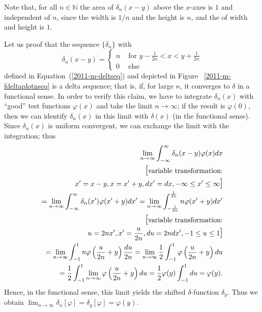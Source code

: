 Note that, for all $n\in \mathbb{N}$ the area of $\delta_n(x-y)$ above the $x$-axes
is $1$ and independent of $n$, since the width is $1/n$ and the height is $n$, and the of width and height is $1$.



{
\color{blue}
\bexample
Let us proof that the sequence $\{ \delta_n\}$ with
$$\delta_n(x-y) =
\left\{
\begin{array}{rl}
n & \textrm{ for } y - \frac{1}{2n}  < x < y+ \frac{1}{2n} \\
0& \textrm{ else }
\end{array}
\right.$$
defined in Equation~(\ref{2011-m-deltseq}) and depicted
in Figure~
\ref{2011-m-fdeltaplotnseq}
is a delta sequence;
that is, if, for large $n$, it converges to $\delta$ in a functional sense.
In order to verify this claim, we have to integrate $\delta_n(x)$
with ``good'' test functions $ \varphi (x)$ and take the limit $n\rightarrow \infty$;
if the result is $ \varphi (0)$, then we can identify $\delta_n(x)$ in this limit with $\delta (x)$
(in the functional sense).
Since $\delta_n(x)$ is uniform convergent, we can exchange the limit with the integration; thus
\begin{equation}
\begin{split}
\lim_{n\rightarrow \infty} \int_{-\infty}^\infty \delta_n(x-y) \varphi (x) dx \\
 \textrm{{\Large[}variable transformation:}  \\
  x'=x-y, x= x'+y, dx' =  dx, -\infty\le x' \le \infty \textrm{\Large]} \\
 =
\lim_{n\rightarrow \infty} \int_{-\infty}^\infty \delta_n(x') \varphi (x'+y) dx'
 =
\lim_{n\rightarrow \infty} \int_{- \frac{1}{2n}}^\frac{1}{2n} n \varphi (x'+y) dx'    \\
 \textrm{{\Large[}variable transformation:}  \\
  u=2nx', x'=\frac{u}{2n},
   du = 2n dx', -1\le u \le 1\textrm{\Large]} \\
 = \lim_{n\rightarrow \infty} \int_{- 1}^1 n \varphi \left(\frac{ u}{2n}+y\right) \frac{du}{2n}
 =
\lim_{n\rightarrow \infty} \frac{1}{2} \int_{- 1}^1 \varphi \left(\frac{ u}{2n}+y\right) du     \\
 =
\frac{1}{2} \int_{- 1}^1 \lim_{n\rightarrow \infty} \varphi \left(\frac{ u}{2n}+y\right) du
  =
\frac{1}{2} \varphi (y) \int_{- 1}^1  du
  =
\varphi (y)
.
\end{split}
\end{equation}
Hence, in the functional sense,
this limit yields the shifted $\delta$-function $\delta_y$.
Thus we obtain
$
\lim_{n\rightarrow \infty} \delta_n[\varphi] = \delta_y [\varphi] = \varphi (y)
$.
\eexample
}


